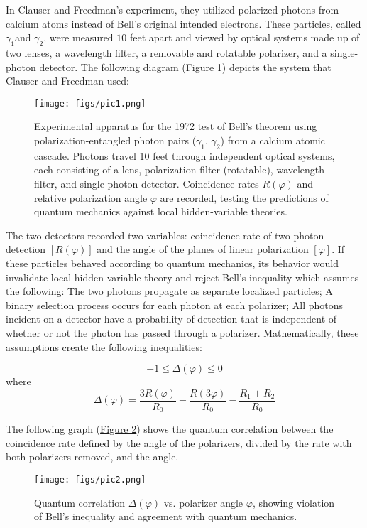 \documentclass{article}
\begin{document}
In Clauser and Freedman’s experiment, they utilized polarized photons from calcium atoms instead of Bell’s original intended electrons. These particles, called $\gamma_1$and $\gamma_2$, were measured $10$ feet apart and viewed by optical systems made up of two lenses, a wavelength filter, a removable and rotatable polarizer, and a single-photon detector. The following diagram (\hyperref[fig:system-diagram]{Figure 1}) depicts the system that Clauser and Freedman used: 

\begin{figure}
    \centering
    \texttt{[image: figs/pic1.png]}
    \caption{Experimental apparatus for the 1972 test of Bell’s theorem using polarization-entangled photon pairs ($\gamma_1$, $\gamma_2$) from a calcium atomic cascade. Photons travel 10 feet through independent optical systems, each consisting of a lens, polarization filter (rotatable), wavelength filter, and single-photon detector. Coincidence rates $R(\varphi)$ and relative polarization angle $\varphi$ are recorded, testing the predictions of quantum mechanics against local hidden-variable theories.}
    \label{fig:system-diagram}
\end{figure}

The two detectors recorded two variables: coincidence rate of two-photon detection $[R(\varphi)]$ and the angle of the planes of linear polarization $[\varphi]$. If these particles behaved according to quantum mechanics, its behavior would invalidate local hidden-variable theory and reject Bell’s inequality which assumes the following: The two photons propagate as separate localized particles; A binary selection process occurs for each photon at each polarizer; All photons incident on a detector have a probability of detection that is independent of whether or not the photon has passed through a polarizer. Mathematically, these assumptions create the following inequalities:

$$-1 \leq \Delta(\varphi) \leq 0$$
where
$$\Delta(\varphi) = \frac{3R(\varphi)}{R_0} - \frac{R(3\varphi)}{R_0} - \frac{R_1+R_2}{R_0}$$

The following graph (\hyperref[fig:angles-graph]{Figure 2}) shows the quantum correlation between the coincidence rate defined by the angle of the polarizers, divided by the rate with both polarizers removed, and the angle. 

\begin{figure}
    \centering
    \texttt{[image: figs/pic2.png]}
    \caption{Quantum correlation $\Delta(\varphi)$ vs. polarizer angle $\varphi$, showing violation of Bell’s inequality and agreement with quantum mechanics.}
    \label{fig:angles-graph}
\end{figure}
\end{document}
